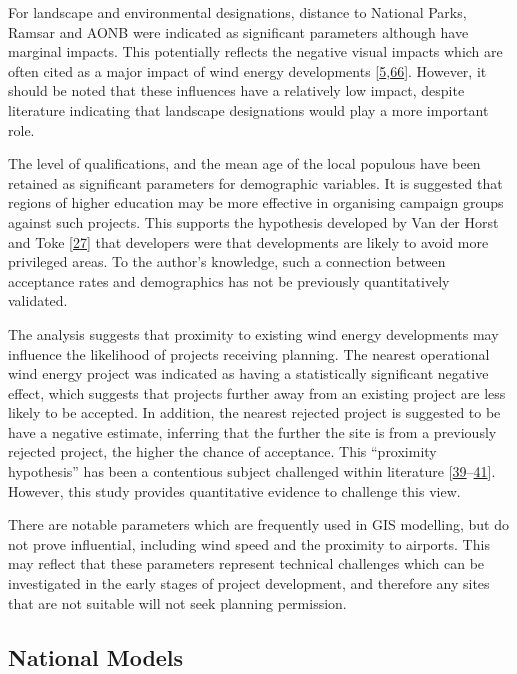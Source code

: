 \documentclass[a4paper,]{article}
\theoremstyle{definition}
\theoremstyle{definition}
\theoremstyle{definition}
\theoremstyle{remark}
\begin{document}
For landscape and environmental designations, distance to National
Parks, Ramsar and AONB were indicated as significant parameters although
have marginal impacts. This potentially reflects the negative visual
impacts which are often cited as a major impact of wind energy
developments
{[}\protect\hyperlink{ref-Langer2016}{5},\protect\hyperlink{ref-Jones2010a}{66}{]}.
However, it should be noted that these influences have a relatively low
impact, despite literature indicating that landscape designations would
play a more important role.

The level of qualifications, and the mean age of the local populous have
been retained as significant parameters for demographic variables. It is
suggested that regions of higher education may be more effective in
organising campaign groups against such projects. This supports the
hypothesis developed by Van der Horst and Toke
{[}\protect\hyperlink{ref-VanderHorst2010}{27}{]} that developers were
that developments are likely to avoid more privileged areas. To the
author's knowledge, such a connection between acceptance rates and
demographics has not be previously quantitatively validated.

The analysis suggests that proximity to existing wind energy
developments may influence the likelihood of projects receiving
planning. The nearest operational wind energy project was indicated as
having a statistically significant negative effect, which suggests that
projects further away from an existing project are less likely to be
accepted. In addition, the nearest rejected project is suggested to be
have a negative estimate, inferring that the further the site is from a
previously rejected project, the higher the chance of acceptance. This
``proximity hypothesis'' has been a contentious subject challenged
within literature
{[}\protect\hyperlink{ref-Eltham2008}{39}--\protect\hyperlink{ref-Ladenburg2006}{41}{]}.
However, this study provides quantitative evidence to challenge this
view.

There are notable parameters which are frequently used in GIS modelling,
but do not prove influential, including wind speed and the proximity to
airports. This may reflect that these parameters represent technical
challenges which can be investigated in the early stages of project
development, and therefore any sites that are not suitable will not seek
planning permission.

\subsection{National Models}\label{national-models}
\end{document}
